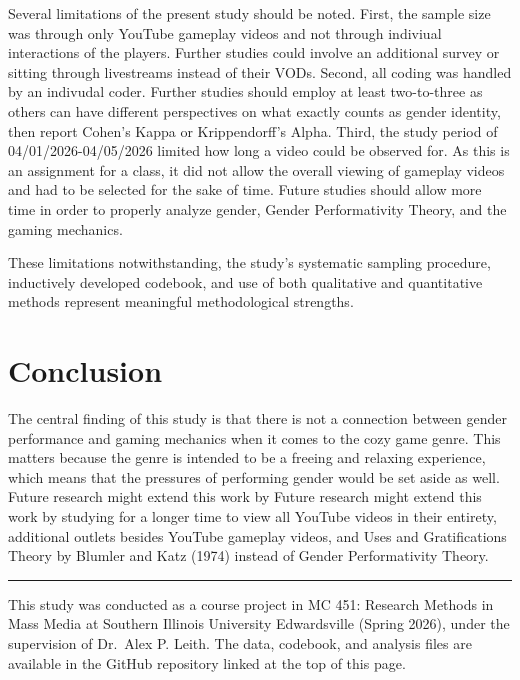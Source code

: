 \documentclass[
  12pt,
  letterpaper,
  DIV=11,
  numbers=noendperiod]{scrreprt}
\begin{document}
Several limitations of the present study should be noted. First, the
sample size was through only YouTube gameplay videos and not through
indiviual interactions of the players. Further studies could involve an
additional survey or sitting through livestreams instead of their VODs.
Second, all coding was handled by an indivudal coder. Further studies
should employ at least two-to-three as others can have different
perspectives on what exactly counts as gender identity, then report
Cohen's Kappa or Krippendorff's Alpha. Third, the study period of
04/01/2026-04/05/2026 limited how long a video could be observed for. As
this is an assignment for a class, it did not allow the overall viewing
of gameplay videos and had to be selected for the sake of time. Future
studies should allow more time in order to properly analyze gender,
Gender Performativity Theory, and the gaming mechanics.

These limitations notwithstanding, the study's systematic sampling
procedure, inductively developed codebook, and use of both qualitative
and quantitative methods represent meaningful methodological strengths.

\section{Conclusion}\label{conclusion}

The central finding of this study is that there is not a connection
between gender performance and gaming mechanics when it comes to the
cozy game genre. This matters because the genre is intended to be a
freeing and relaxing experience, which means that the pressures of
performing gender would be set aside as well. Future research might
extend this work by Future research might extend this work by studying
for a longer time to view all YouTube videos in their entirety,
additional outlets besides YouTube gameplay videos, and Uses and
Gratifications Theory by Blumler and Katz (1974) instead of Gender
Performativity Theory.

\begin{center}\rule{0.5\linewidth}{0.5pt}\end{center}

\begin{tcolorbox}[enhanced jigsaw, arc=.35mm, bottomrule=.15mm, bottomtitle=1mm, breakable, colback=white, colbacktitle=quarto-callout-note-color!10!white, colframe=quarto-callout-note-color-frame, coltitle=black, left=2mm, leftrule=.75mm, opacityback=0, opacitybacktitle=0.6, rightrule=.15mm, title=\textcolor{quarto-callout-note-color}{\faInfo}\hspace{0.5em}{A Note on This Project}, titlerule=0mm, toprule=.15mm, toptitle=1mm]

This study was conducted as a course project in MC 451: Research Methods
in Mass Media at Southern Illinois University Edwardsville (Spring
2026), under the supervision of Dr.~Alex P. Leith. The data, codebook,
and analysis files are available in the GitHub repository linked at the
top of this page.

\end{tcolorbox}
\end{document}
